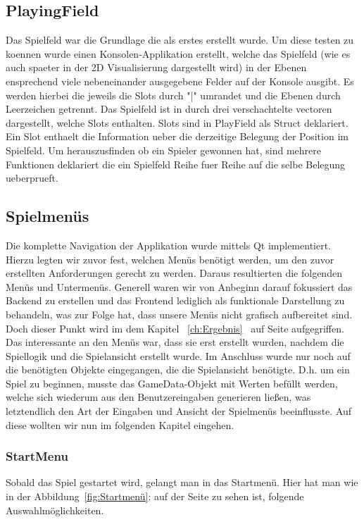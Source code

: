 \documentclass[a4paper]{scrartcl}
\begin{document}
\subsection{PlayingField}\label{ch:PlayingField}
Das Spielfeld war die Grundlage die als erstes erstellt wurde. Um diese testen zu koennen wurde einen Konsolen-Applikation erstellt, welche das Spielfeld (wie es auch spaeter in der 2D Visualisierung dargestellt
wird) in der Ebenen ensprechend viele nebeneinander ausgegebene Felder auf der Konsole ausgibt. Es werden hierbei die jeweils die Slots durch "|" umrandet und die Ebenen durch Leerzeichen getrennt.
Das Spielfeld ist in durch drei verschachtelte vectoren dargestellt, welche Slots enthalten. Slots sind in PlayField als Struct deklariert. Ein Slot enthaelt die Information ueber die derzeitige Belegung der Position im Spielfeld. 
Um herauszusfinden ob ein Spieler gewonnen hat, sind mehrere  Funktionen deklariert die ein Spielfeld Reihe fuer Reihe auf die selbe Belegung ueberprueft.
\subsection{Spielmenüs}\label{ch:Spielmenüs}
Die komplette Navigation der Applikation wurde mittels Qt implementiert. Hierzu legten wir zuvor fest, welchen Menüs benötigt werden, um den zuvor erstellten Anforderungen gerecht zu werden. Daraus resultierten die folgenden Menüs und Untermenüs. Generell waren wir von Anbeginn darauf fokussiert das Backend zu erstellen und das Frontend lediglich als funktionale Darstellung zu behandeln, was zur Folge hat, dass unsere Menüs nicht grafisch aufbereitet sind. Doch dieser Punkt wird im dem Kapitel ~\ref{ch:Ergebnis}  \glqq{}\grqq \ auf Seite \pageref{ch:Ergebnis} aufgegriffen.
\\
Das interessante an den Menüs war, dass sie erst erstellt wurden, nachdem die Spiellogik und die Spielansicht erstellt wurde. Im Anschluss wurde nur noch auf die benötigten Objekte eingegangen, die die Spielansicht benötigte. D.h. um ein Spiel zu beginnen, musste das GameData-Objekt mit Werten befüllt werden, welche sich wiederum aus den Benutzereingaben generieren ließen, was letztendlich den Art der Eingaben und Ansicht der Spielmenüs beeinflusste. Auf diese wollten wir nun im folgenden Kapitel eingehen.

\subsubsection{StartMenu}\label{ch:StartMenu}
Sobald das Spiel gestartet wird, gelangt man in das Startmenü. Hier hat man wie in der Abbildung~\ref{fig:Startmenü}: auf der Seite \pageref{fig:Startmenü} zu sehen ist, folgende Auswahlmöglichkeiten.
\end{document}
